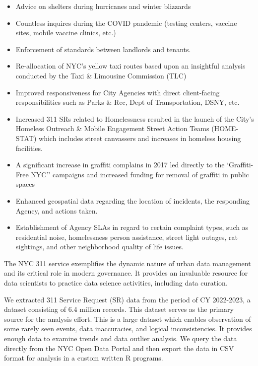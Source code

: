 \documentclass[12pt, titlepage]{article}
\begin{document}
\begin{itemize}
	\item Advice on shelters during hurricanes and winter blizzards
	\item Countless inquires during the COVID pandemic (testing centers, vaccine sites, mobile vaccine clinics, etc.)
	\item Enforcement of standards between landlords and tenants.
	\item Re-allocation of NYC's yellow taxi routes based upon an insightful analysis conducted by the Taxi \& Limousine Commission (TLC)
	\item Improved responsiveness for City Agencies with direct client-facing responsibilities such as Parks \& Rec, Dept of Transportation, DSNY, etc.
	\item Increased 311 SRs related to Homelessness resulted in the launch of the City's Homeless Outreach \& Mobile Engagement Street Action Teams (HOME-STAT)
	which includes street canvassers and increases in homeless housing facilities.
	\item A significant increase in graffiti complains in 2017 led directly to the `Graffiti-Free NYC'' campaigns and increased funding for removal of graffiti in public spaces
	\item Enhanced geospatial data regarding the location of incidents, the responding Agency, and actions taken.
	\item Establishment of Agency SLAs in regard to certain complaint types, such as residential noise, homelessness person assistance, street light outages, 
	rat sightings, and other neighborhood quality of life issues.
\end{itemize}

The NYC 311 service exemplifies the dynamic nature of urban data
management and its critical role in modern governance. It provides an
invaluable resource for data scientists to practice data science
activities, including data curation.

We extracted  311 Service Request (SR) data from the period of CY 2022-2023, a dataset consisting of
6.4 million records. This dataset serves as the primary source for the analysis effort. This is a large dataset which enables 
observation of some rarely seen events, data inaccuracies, and logical inconsistencies. It provides enough data to examine trends and data outlier analysis. 
We query the data directly from the NYC Open Data Portal and then export the data in CSV format for analysis in a custom written R programs.
\end{document}

